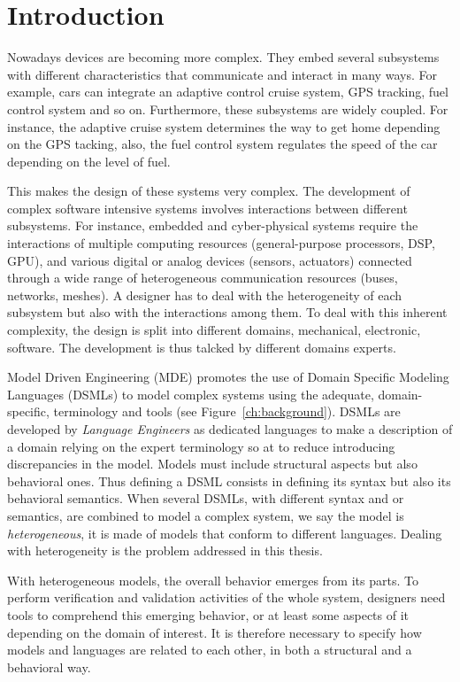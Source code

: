 \chapter{Introduction}	
Nowadays devices are becoming more complex. They embed several subsystems with different characteristics that communicate and interact in many ways. For example, cars can integrate an adaptive control cruise system, GPS tracking, fuel control system and so on. Furthermore, these subsystems are widely coupled. For instance, the adaptive cruise system determines the way to get home depending on the GPS tacking, also, the fuel control system regulates the speed of the car depending on the level of fuel.

This makes the design of these systems very complex. The development of complex software intensive systems involves interactions between different subsystems. For instance, embedded and cyber-physical systems require the interactions of multiple computing resources (general-purpose processors, DSP, GPU), and various digital or analog devices (sensors, actuators) connected through a wide range of heterogeneous communication resources (buses, networks, meshes).  A designer has to deal with the heterogeneity of each subsystem but also with the interactions among them. To deal with this inherent complexity, the design is split into different domains, \eg mechanical, electronic, software. The development is thus talcked by different domains experts.

Model Driven Engineering (MDE) promotes the use of Domain Specific Modeling Languages (DSMLs) to model complex systems using the adequate, domain-specific, terminology and tools (see Figure~\ref{ch:background}). DSMLs are developed by \emph{Language Engineers} as dedicated languages to make a description of a domain relying on the expert terminology so at to reduce introducing discrepancies in the model. Models must include structural aspects but also behavioral ones. Thus defining a DSML consists in defining its syntax but also its behavioral semantics. When several DSMLs, with different syntax and or semantics, are combined to model a complex system, we say the model is \emph{heterogeneous}, \ie it is made of models that conform to different languages. Dealing with heterogeneity is the problem addressed in this thesis. 

With heterogeneous models, the overall behavior emerges from its parts. To perform verification and validation activities of the whole system, designers need tools to comprehend this emerging behavior, 
or at least some aspects of it depending on the domain of interest. It is therefore necessary to specify how models and languages are related to each other, in both a structural and a behavioral way.

